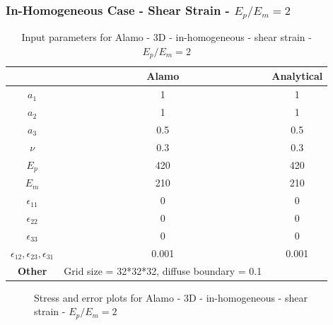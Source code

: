 \documentclass[12pt, a4paper]{report}
\begin{document}
\newpage

\subsubsection{In-Homogeneous Case - Shear Strain - $E_p/E_m = 2$}
\begin{table}[H]
    \centering
    \begin{tabular}{|c|c|c|}
        \hline
        & \textbf{Alamo} &\textbf{Analytical}\\
        \hline
        \textbf{$a_1$} & 1 & 1 \\
        \hline
        \textbf{$a_2$} & 1 & 1 \\
        \hline
        \textbf{$a_3$} & 0.5 & 0.5 \\
        \hline
        \textbf{$\nu$} & 0.3 & 0.3 \\
        \hline
        \textbf{$E_p$} & 420 & 420 \\
        \hline
        \textbf{$E_m$} & 210 & 210 \\
        \hline
        \textbf{$\epsilon_{11}$} & 0 & 0 \\
        \hline
        \textbf{$\epsilon_{22}$} & 0 & 0 \\
        \hline
        \textbf{$\epsilon_{33}$} & 0 & 0 \\
        \hline
        \textbf{$\epsilon_{12}, \epsilon_{23}, \epsilon_{31}$} & 0.001 & 0.001 \\
        \hline
        \textbf{Other} & Grid size = 32*32*32, diffuse boundary = 0.1 &  \\
        \hline
    \end{tabular}
    \caption{Input parameters for Alamo - 3D - in-homogeneous - shear strain - $E_p/E_m = 2$}
\end{table}

\begin{figure}[htbp]
  \centering
  \hfill
  \caption{Stress and error plots for Alamo - 3D - in-homogeneous - shear strain - $E_p/E_m = 2$}
\end{figure}
\end{document}
